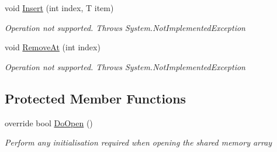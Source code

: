 \begin{DoxyCompactItemize}
void \hyperlink{class_shared_memory_1_1_shared_array_a68a65a4587446af1eeec984779863780}{Insert} (int index, T item)
\begin{DoxyCompactList}\small\item\em Operation not supported. Throws System.\+Not\+Implemented\+Exception \end{DoxyCompactList}\item 
void \hyperlink{class_shared_memory_1_1_shared_array_ad57a17abd0897ec919089dd82dff8b58}{Remove\+At} (int index)
\begin{DoxyCompactList}\small\item\em Operation not supported. Throws System.\+Not\+Implemented\+Exception \end{DoxyCompactList}\end{DoxyCompactItemize}
\subsection*{Protected Member Functions}
\begin{DoxyCompactItemize}
\item 
override bool \hyperlink{class_shared_memory_1_1_shared_array_ac6a9a9606b9287538a148eb3175f7562}{Do\+Open} ()
\begin{DoxyCompactList}\small\item\em Perform any initialisation required when opening the shared memory array \end{DoxyCompactList}\end{DoxyCompactItemize}
